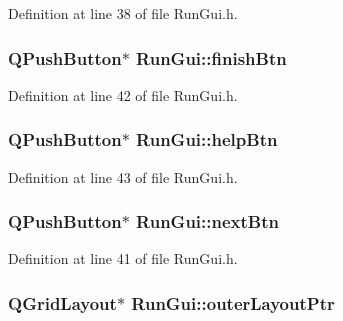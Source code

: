 Definition at line 38 of file Run\-Gui.\-h.

\hypertarget{class_run_gui_a2989fde08a236488c152c8fa584c3380}{
\subsubsection[{finish\-Btn}]{\setlength{\rightskip}{0pt plus 5cm}Q\-Push\-Button$\ast$ Run\-Gui\-::finish\-Btn\hspace{0.3cm}{\ttfamily [private]}}}\label{class_run_gui_a2989fde08a236488c152c8fa584c3380}


Definition at line 42 of file Run\-Gui.\-h.

\hypertarget{class_run_gui_a6c0a17f55049da888442fbc28dff7a78}{
\subsubsection[{help\-Btn}]{\setlength{\rightskip}{0pt plus 5cm}Q\-Push\-Button$\ast$ Run\-Gui\-::help\-Btn\hspace{0.3cm}{\ttfamily [private]}}}\label{class_run_gui_a6c0a17f55049da888442fbc28dff7a78}


Definition at line 43 of file Run\-Gui.\-h.

\hypertarget{class_run_gui_a02bb63cd6c6d77933f98087111ce1a66}{
\subsubsection[{next\-Btn}]{\setlength{\rightskip}{0pt plus 5cm}Q\-Push\-Button$\ast$ Run\-Gui\-::next\-Btn\hspace{0.3cm}{\ttfamily [private]}}}\label{class_run_gui_a02bb63cd6c6d77933f98087111ce1a66}


Definition at line 41 of file Run\-Gui.\-h.

\hypertarget{class_run_gui_ae4cdc2ec0797c9121a47b9cdf3b93115}{
\subsubsection[{outer\-Layout\-Ptr}]{\setlength{\rightskip}{0pt plus 5cm}Q\-Grid\-Layout$\ast$ Run\-Gui\-::outer\-Layout\-Ptr\hspace{0.3cm}{\ttfamily [private]}}}\label{class_run_gui_ae4cdc2ec0797c9121a47b9cdf3b93115}


